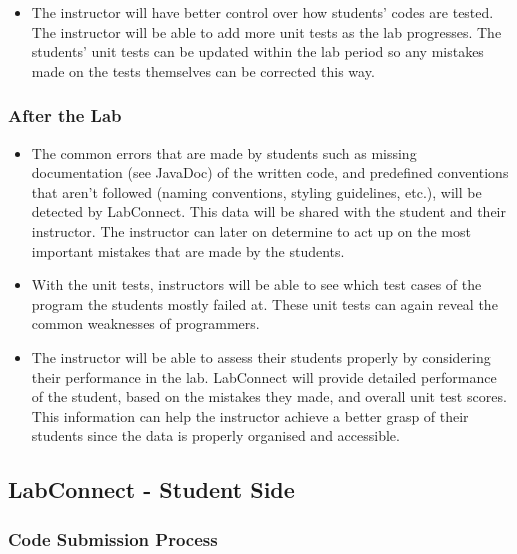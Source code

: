 \documentclass[a4paper, 12pt]{article}
\begin{document}
    \begin{itemize}
        \item The instructor will have better control over how students' codes are tested.
        The instructor will be able to add more unit tests as the lab progresses.
        The students' unit tests can be updated within the lab period so any mistakes made
        on the tests themselves can be corrected this way.
    \end{itemize}

    \subsubsection{After the Lab}

    \begin{itemize}
        \item The common errors that are made by students such as missing documentation (see JavaDoc)
        of the written code, and predefined conventions that aren't followed (naming conventions, styling
        guidelines, etc.), will be detected by LabConnect. This data will be shared with the student
        and their instructor. The instructor can later on determine to act up on the most
        important mistakes that are made by the students.
        \item With the unit tests, instructors will be able to see which test cases of the program
        the students mostly failed at. These unit tests can again reveal the common weaknesses
        of programmers.
        \item The instructor will be able to assess their students properly by considering their
        performance in the lab. LabConnect will provide detailed performance of the student,
        based on the mistakes they made, and overall unit test scores. This information can help
        the instructor achieve a better grasp of their students since the data is properly organised
        and accessible.
    \end{itemize}

    \subsection{LabConnect - Student Side}

    \subsubsection{Code Submission Process}
\end{document}
